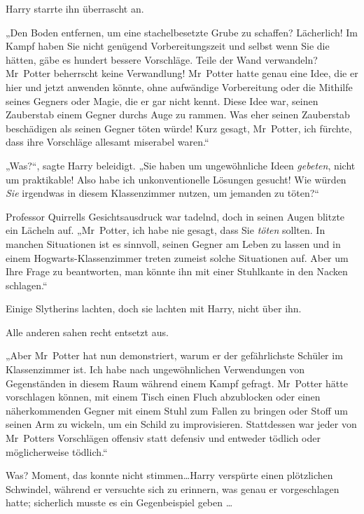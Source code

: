 {Harry starrte ihn überrascht an.

„Den Boden entfernen, um eine stachelbesetzte Grube zu schaffen? Lächerlich! Im Kampf haben Sie nicht genügend Vorbereitungszeit und selbst wenn Sie die hätten, gäbe es hundert bessere Vorschläge. Teile der Wand verwandeln? Mr~Potter beherrscht keine Verwandlung! Mr~Potter hatte genau eine Idee, die er hier und jetzt anwenden könnte, ohne aufwändige Vorbereitung oder die Mithilfe seines Gegners oder Magie, die er gar nicht kennt. Diese Idee war, seinen Zauberstab einem Gegner durchs Auge zu rammen. Was eher seinen Zauberstab beschädigen als seinen Gegner töten würde! Kurz gesagt, Mr~Potter, ich fürchte, dass ihre Vorschläge allesamt miserabel waren.“

„Was?“, sagte Harry beleidigt. „Sie haben um ungewöhnliche Ideen \emph{gebeten}, nicht um praktikable! Also habe ich unkonventionelle Lösungen gesucht! Wie würden \emph{Sie} irgendwas in diesem Klassenzimmer nutzen, um jemanden zu töten?“

Professor Quirrells Gesichtsausdruck war tadelnd, doch in seinen Augen blitzte ein Lächeln auf. „Mr~Potter, ich habe nie gesagt, dass Sie \emph{töten} sollten. In manchen Situationen ist es sinnvoll, seinen Gegner am Leben zu lassen und in einem Hogwarts-Klassenzimmer treten zumeist solche Situationen auf. Aber um Ihre Frage zu beantworten, man könnte ihn mit einer Stuhlkante in den Nacken schlagen.“

Einige Slytherins lachten, doch sie lachten mit Harry, nicht über ihn.

Alle anderen sahen recht entsetzt aus.

„Aber Mr~Potter hat nun demonstriert, warum er der gefährlichste Schüler im Klassenzimmer ist. Ich habe nach ungewöhnlichen Verwendungen von Gegenständen in diesem Raum während einem Kampf gefragt. Mr~Potter hätte vorschlagen können, mit einem Tisch einen Fluch abzublocken oder einen näherkommenden Gegner mit einem Stuhl zum Fallen zu bringen oder Stoff um seinen Arm zu wickeln, um ein Schild zu improvisieren. Stattdessen war jeder von Mr~Potters Vorschlägen offensiv statt defensiv und entweder tödlich oder möglicherweise tödlich.“

Was? Moment, das konnte nicht stimmen…Harry verspürte einen plötzlichen Schwindel, während er versuchte sich zu erinnern, was genau er vorgeschlagen hatte; sicherlich musste es ein Gegenbeispiel geben …

}
